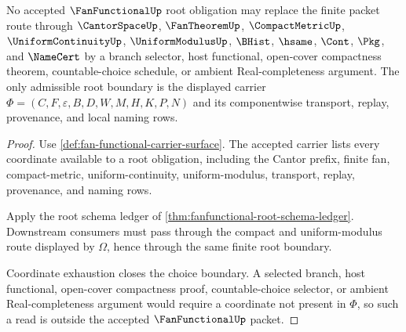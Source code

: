 \begin{theorem}\label{thm:fan-functional-root-choice-boundary}
No accepted $\FanFunctionalUp$ root obligation may replace the finite packet route through $\CantorSpaceUp$, $\FanTheoremUp$, $\CompactMetricUp$, $\UniformContinuityUp$, $\UniformModulusUp$, $\BHist$, $\hsame$, $\Cont$, $\Pkg$, and $\NameCert$ by a branch selector, host functional, open-cover compactness theorem, countable-choice schedule, or ambient Real-completeness argument. The only admissible root boundary is the displayed carrier $\Phi=(C,F,\varepsilon,B,D,W,M,H,K,P,N)$ and its componentwise transport, replay, provenance, and local naming rows.
\end{theorem}
\begin{proof}
Use \autoref{def:fan-functional-carrier-surface}. The accepted carrier lists every coordinate available to a root obligation, including the Cantor prefix, finite fan, compact-metric, uniform-continuity, uniform-modulus, transport, replay, provenance, and naming rows.

Apply the root schema ledger of \autoref{thm:fanfunctional-root-schema-ledger}. Downstream consumers must pass through the compact and uniform-modulus route displayed by $\Omega$, hence through the same finite root boundary.

Coordinate exhaustion closes the choice boundary. A selected branch, host functional, open-cover compactness proof, countable-choice selector, or ambient Real-completeness argument would require a coordinate not present in $\Phi$, so such a read is outside the accepted $\FanFunctionalUp$ packet.
\end{proof}
